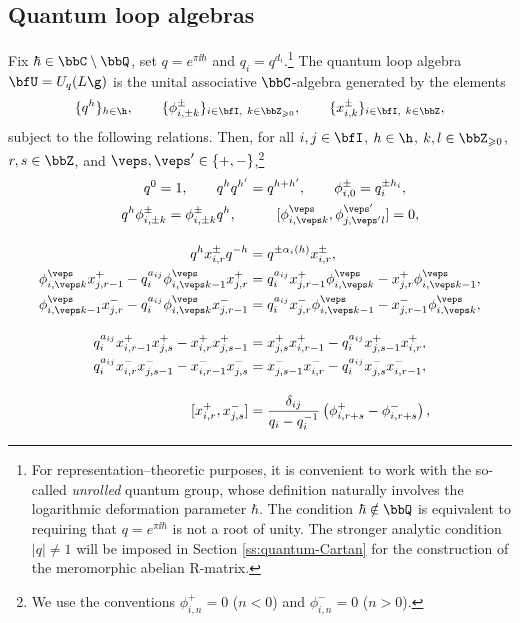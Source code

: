 \documentclass[reqno]{amsart}
\numberwithin{equation}{section}
\begin{document}
\subsection{Quantum loop algebras \cite{drinfeld-88, hernandez-05}}\label{ss:QL}	
Fix $\hbar\in\bbC\setminus\bbQ$, set $q=e^{\pi\ii\hbar}$ and $q_i=q^{d_i}$.\footnote{
For representation--theoretic purposes, it is convenient to work
with the so-called \emph{unrolled} quantum group, whose definition naturally
involves the logarithmic deformation parameter $\hbar$. The condition $\hbar\notin\bbQ$ is equivalent to requiring that
$q=e^{\pi\ii\hbar}$ is not a root of unity. The stronger analytic condition $|q|\neq1$ will be
imposed in Section \ref{ss:quantum-Cartan} for the construction of the
meromorphic abelian R-matrix.}
The quantum loop algebra $\bfU=U_q(L\g)$ is the unital associative
$\bbC$-algebra generated by the elements
\[
\{q^h\}_{h\in\h},
\qquad
\{\phi^\pm_{i,\pm k}\}_{i\in\bfI,\ k\in\bbZ_{\geqslant0}},
\qquad
\{x^\pm_{i,k}\}_{i\in\bfI,\ k\in\bbZ},
\]
subject to the following relations. 
Then, for all $i,j\in\bfI$, $h\in\h$, $k,l\in\bbZ_{\geqslant0}$, $r,s\in\bbZ$,
and $\veps,\veps'\in\{+,-\}$,\footnote{
We use the conventions $\phi^+_{i,n}=0$ ($n<0$) and $\phi^-_{i,n}=0$ ($n>0$).}
\begin{align}
	\label{eq:QL-full-rels-cartan}
	q^0=1,
	\qquad
	q^hq^{h'}&=q^{h+h'},
	\qquad
	\phi^\pm_{i,0}=q_i^{\pm h_i},
	\\
	\label{eq:QL-full-rels-phi-h}
	q^h\phi^\pm_{i,\pm k}
	=
	\phi^\pm_{i,\pm k}q^h,
	\quad&\qquad
	[\phi^\veps_{i,\veps k},\phi^{\veps'}_{j,\veps' l}]=0,
	\\[1em]
	\label{eq:QL-full-rels-weight}
	q^h x^\pm_{i,r}q^{-h}
	&=
	q^{\pm\alpha_i(h)}x^\pm_{i,r},
	\\
	\label{eq:QL-full-rels-phi-x-plus}
	\phi^\veps_{i,\veps k}x^+_{j,r-1}
	-
	q_i^{a_{ij}}{\phi^\veps_{i,\veps k-1}}x^+_{j,r}
	&=
	q_i^{a_{ij}}x^+_{j,r-1}\phi^\veps_{i,\veps k}
	-
	x^+_{j,r}{\phi^\veps_{i,\veps k-1}},
	\\
	\label{eq:QL-full-rels-phi-x-minus}
	{\phi^\veps_{i,\veps k-1}}x^-_{j,r}
	-
	q_i^{a_{ij}}\phi^\veps_{i,\veps k}x^-_{j,r-1}
	&=
	q_i^{a_{ij}}x^-_{j,r}{\phi^\veps_{i,\veps k-1}}
	-
	x^-_{j,r-1}\phi^\veps_{i,\veps k},
	\\[1em]
	\label{eq:QL-full-rels-x-x-plus}
	q_i^{a_{ij}}x^+_{i,r-1}x^+_{j,s}
	-
	x^+_{i,r}x^+_{j,s-1}
	&=
	x^+_{j,s}x^+_{i,r-1}
	-
	q_i^{a_{ij}}x^+_{j,s-1}x^+_{i,r},
	\\
	\label{eq:QL-full-rels-x-x-minus}
	q_i^{a_{ij}}x^-_{i,r}x^-_{j,s-1}
	-
	x^-_{i,r-1}x^-_{j,s}
	&=
	x^-_{j,s-1}x^-_{i,r}
	-
	q_i^{a_{ij}}x^-_{j,s}x^-_{i,r-1},
	\\[1em]
	\label{eq:QL-full-rels-double}
	[x^+_{i,r},x^-_{j,s}]
	&=
	\frac{\delta_{ij}}{q_i-q_i^{-1}}
	\left(
	\phi^+_{i,r+s}
	-
	\phi^-_{i,r+s}
	\right),
\end{align}
\end{document}
